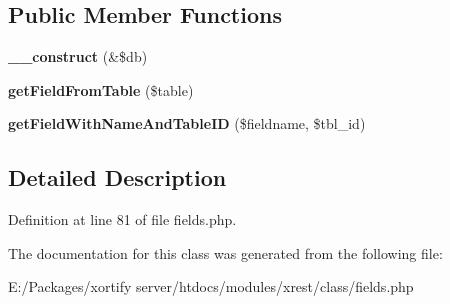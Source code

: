 \subsection*{Public Member Functions}
\begin{DoxyCompactItemize}
\item 
\hypertarget{class_xrest_fields_handler_aaf2ef772755ec6f361d44e16cc9ffd69}{{\bfseries \-\_\-\-\_\-construct} (\&\$db)}\label{class_xrest_fields_handler_aaf2ef772755ec6f361d44e16cc9ffd69}

\item 
\hypertarget{class_xrest_fields_handler_a91c3b19d403199d1e254a82e97f76c63}{{\bfseries get\-Field\-From\-Table} (\$table)}\label{class_xrest_fields_handler_a91c3b19d403199d1e254a82e97f76c63}

\item 
\hypertarget{class_xrest_fields_handler_a1b0f3b42fb06802aa19e78a5c2d1c61f}{{\bfseries get\-Field\-With\-Name\-And\-Table\-I\-D} (\$fieldname, \$tbl\-\_\-id)}\label{class_xrest_fields_handler_a1b0f3b42fb06802aa19e78a5c2d1c61f}

\end{DoxyCompactItemize}


\subsection{Detailed Description}


Definition at line 81 of file fields.\-php.



The documentation for this class was generated from the following file\-:\begin{DoxyCompactItemize}
\item 
E\-:/\-Packages/xortify server/htdocs/modules/xrest/class/fields.\-php\end{DoxyCompactItemize}
